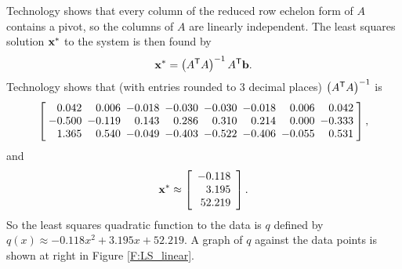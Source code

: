 \begin{example}
Technology shows that every column of the reduced row echelon form of $A$ contains a pivot, so the columns of $A$ are linearly independent. The least squares solution $\mathbf{x}^*$ to the system is then found by 
\[\mathbf{x}^* = \left(A^{\mathsf{T}}A\right)^{-1}A^{\mathsf{T}} \mathbf{b}.\]
Technology shows that (with entries rounded to 3 decimal places) $\left(A^{\mathsf{T}}A\right)^{-1}$ is 
\[\left[ \arraycolsep=2.5pt  \begin{array}{rrrrrrrr}  0.042& 0.006&- 0.018&- 0.030&- 0.030&- 0.018& 0.006& 0.042\\ - 0.500&- 0.119& 0.143& 0.286& 0.310& 0.214& 0.000&-0.333\\  1.365& 0.540&- 0.049&- 0.403&-0.522&- 0.406&- 0.055& 0.531\end {array} \right],\]
and 
\[\mathbf{x}^* \approx \left[ \begin{array}{r} -0.118 \\ 3.195 \\ 52.219 \end{array} \right].\]
So the least squares quadratic function to the data is $q$ defined by $q(x) \approx -0.118x^2+3.195x + 52.219$. A graph of $q$ against the data points is shown at right in Figure \ref{F:LS_linear}. 
 	
	\ea

\end{example}

